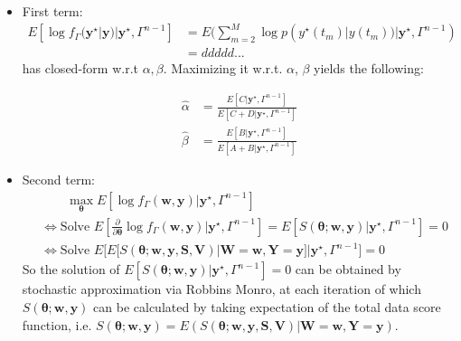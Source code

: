 \documentclass[10pt,letterpaper]{article}
\numberwithin{table}{section}
\numberwithin{figure}{section}
\numberwithin{equation}{section}
\begin{document}
\begin{itemize}




\item First term: \\
\begin{equation}
\begin{split}
E[\log f_{\Gamma}(\bm y^\star|\bm y)| \bm y^\star, \Gamma^{n-1}] &= E( \sum_{m=2}^M \log p(y^\star(t_m)|y(t_m)) | \bm y^\star, \Gamma^{n-1}) \\
& = ddddd...
\end{split}
\end{equation}
has closed-form w.r.t $\alpha, \beta$. Maximizing it w.r.t. $\alpha$, $\beta$ yields the following:

\begin{equation}
\begin{split}
\hat \alpha &= \frac{E[C| \bm y^\star,\Gamma^{n-1}]}
{E[C+D| \bm y^\star,\Gamma^{n-1} ]} \\
\hat \beta & = \frac{E[B| \bm y^\star,\Gamma^{n-1}]}
{E[A+B| \bm y^\star,\Gamma^{n-1} ]} 
\end{split}
\end{equation}





\item Second term: \\
\begin{equation}
\begin{split}
& \qquad \max_{\bm \theta} E[\log f_{\Gamma}(\bm w, \bm y)| \bm y^\star, \Gamma^{n-1}]  \\
 & \Leftrightarrow
 \text{Solve } E[ \frac{\partial}{\partial \bm \theta}
 \log f_{\Gamma}(\bm w, \bm y)| \bm y^\star, \Gamma^{n-1}]  = E[ S(\bm \theta; \bm w,\bm y)| \bm y^\star, \Gamma^{n-1}] =0 \\
& \Leftrightarrow
\text{Solve }
  E \Big[ 
  E \big[ S(\bm \theta; \bm w, \bm y, \bm S, \bm V)|\bm W = \bm w, \bm Y=\bm y \big] 
 |\bm y^\star, \Gamma^{n-1}  \Big] = 0
\end{split}
\end{equation}
So the solution of $E[ S(\bm \theta; \bm w,\bm y)| \bm y^\star, \Gamma^{n-1}] =0$ can be obtained by stochastic approximation via Robbins Monro, at each iteration of which $ S(\bm \theta; \bm w,\bm y)$ can be calculated by taking expectation of the total data score function, i.e. 
$S(\bm \theta; \bm w, \bm y) = E(S(\bm \theta; \bm w, \bm y, \bm S, \bm V)|\bm W = \bm w, \bm Y=\bm y)$. 
\end{itemize}
\end{document}

